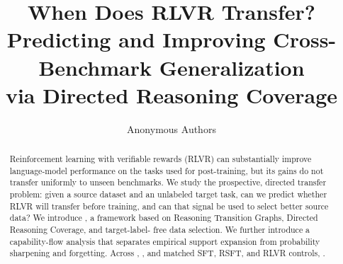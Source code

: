 \documentclass[10pt,twocolumn]{article}
\title{When Does RLVR Transfer?\\
Predicting and Improving Cross-Benchmark Generalization\\
via Directed Reasoning Coverage}
\author{Anonymous Authors}
\date{}
\begin{document}
\maketitle

\begin{abstract}
Reinforcement learning with verifiable rewards (RLVR) can substantially improve
language-model performance on the tasks used for post-training, but its gains
do not transfer uniformly to unseen benchmarks.  We study the prospective,
directed transfer problem: given a source dataset and an unlabeled target task,
can we predict whether RLVR will transfer before training, and can that signal
be used to select better source data?  We introduce \method, a framework based
on Reasoning Transition Graphs, Directed Reasoning Coverage, and target-label-
free data selection.  We further introduce a capability-flow analysis that
separates empirical support expansion from probability sharpening and
forgetting.  Across ,
, and matched SFT, RSFT, and RLVR controls,
.
\end{abstract}













\appendix

\end{document}
